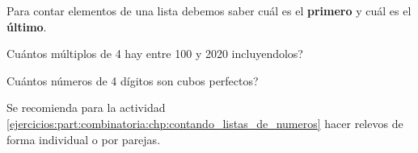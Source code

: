 \begin{tcolorbox}[colback=red!5!white,colframe=red!75!black]
	Para contar elementos de una lista debemos saber cuál es el \textbf{primero} y cuál es el \textbf{último}.	
\end{tcolorbox}

\begin{exer}
	Cuántos múltiplos de 4 hay entre 100 y 2020 incluyendolos?
\end{exer}

\begin{ejemplo}
Cuántos números de 4 dígitos son cubos perfectos?
\end{ejemplo}

\begin{tcolorbox}[colback=white!5!white,colframe=green!50!black]
	Se recomienda para la actividad \ref{ejercicios:part:combinatoria:chp:contando_listas_de_numeros} hacer relevos de forma individual o por parejas.
\end{tcolorbox}


